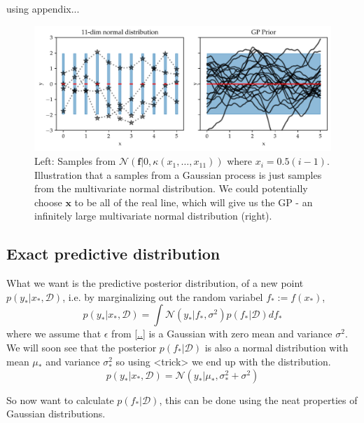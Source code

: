 using appendix...
\begin{figure}[h]
    \centering
    \includegraphics[width = \textwidth]{Pictures/GP_samples_mattern.pdf}
    \caption{Left: Samples from $\mathcal{N}(\textbf{f}|0,\kappa(x_1,\dots, x_{11}))$ where
    $x_i= 0.5(i-1)$. Illustration that a samples from a Gaussian process is just
    samples from the multivariate normal distribution. We could potentially choose
    $\textbf{x}$ to be all of the real line, which will give us the GP - an infinitely
    large multivariate normal distribution (right).}
    \label{GP_illustration}
\end{figure}

\subsection{Exact predictive distribution}
What we want is the predictive posterior distribution, of a new point $p(y_*|x_*, \mathcal{D})$, i.e. by marginalizing 
out the random variabel $f_* := f(x_*)$, 
\begin{equation}\label{GP_predictive}
    p(y_*|x_*,\mathcal{D}) = \int \mathcal{N}(y_*|f_*, \sigma^2) p(f_*|\mathcal{D})df_*
\end{equation}
where we assume that $\epsilon$ from \ref{..} is a Gaussian with zero mean and variance $\sigma^2$.
We will soon see that the posterior $p(f_*|\mathcal{D})$ is also a normal distribution 
with mean $\mu_*$ and variance $\sigma^2_*$ so
using <trick> we end up with the distribution. 
$$p(y_*|x_*,\mathcal{D}) = \mathcal{N}(y_*|\mu_*,\sigma^2_*+\sigma^2)$$

So now want to calculate $p(f_*|\mathcal{D})$, this can be done using the neat properties of Gaussian
distributions.  
